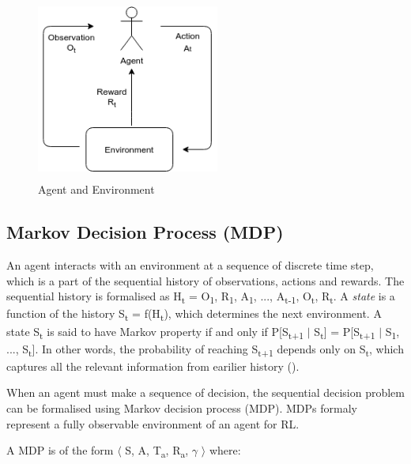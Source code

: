 \documentclass[12pt,twoside]{report}
\begin{document}
\begin{figure}[!htb]
\centering
\includegraphics[width=6cm, height=6cm]{./figures/agent_env}
\caption{Agent and Environment}
\label{agent_env}
\end{figure}

\subsection{Markov Decision Process (MDP)}
An agent interacts with an environment at a sequence of discrete time step, which is a part of the sequential history of observations, actions and rewards. The sequential history is formalised as H\textsubscript{t} = O\textsubscript{1}, R\textsubscript{1}, A\textsubscript{1}, ..., A\textsubscript{t-1}, O\textsubscript{t}, R\textsubscript{t}.  A \textit{state} is a function of the history S\textsubscript{t} = f(H\textsubscript{t}), which determines the next environment.  A state S\textsubscript{t} is said to have Markov property if and only if
P[S\textsubscript{t+1} $\vert$ S\textsubscript{t}] = P[S\textsubscript{t+1} $\vert$ S\textsubscript{1}, ..., S\textsubscript{t}]. In other words, the probability of reaching S\textsubscript{t+1} depends only on S\textsubscript{t}, which captures all the relevant information from earilier history (\cite{Puterman1994}).

When an agent must make a sequence of decision, the sequential decision problem can be formalised using Markov decision process (MDP). MDPs formaly represent a fully observable environment of an agent for RL.

A MDP is of the form $\langle$ S, A, T\textsubscript{a}, R\textsubscript{a}, $\gamma$ $\rangle$ where:
\end{document}
